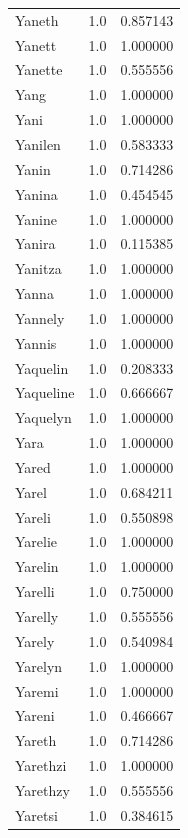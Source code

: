 \documentclass[
  letterpaper,
  DIV=11,
  numbers=noendperiod]{scrreprt}
\begin{document}
\begin{tabular}{lrr}
Yaneth          &   1.0 &   0.857143 \\
Yanett          &   1.0 &   1.000000 \\
Yanette         &   1.0 &   0.555556 \\
Yang            &   1.0 &   1.000000 \\
Yani            &   1.0 &   1.000000 \\
Yanilen         &   1.0 &   0.583333 \\
Yanin           &   1.0 &   0.714286 \\
Yanina          &   1.0 &   0.454545 \\
Yanine          &   1.0 &   1.000000 \\
Yanira          &   1.0 &   0.115385 \\
Yanitza         &   1.0 &   1.000000 \\
Yanna           &   1.0 &   1.000000 \\
Yannely         &   1.0 &   1.000000 \\
Yannis          &   1.0 &   1.000000 \\
Yaquelin        &   1.0 &   0.208333 \\
Yaqueline       &   1.0 &   0.666667 \\
Yaquelyn        &   1.0 &   1.000000 \\
Yara            &   1.0 &   1.000000 \\
Yared           &   1.0 &   1.000000 \\
Yarel           &   1.0 &   0.684211 \\
Yareli          &   1.0 &   0.550898 \\
Yarelie         &   1.0 &   1.000000 \\
Yarelin         &   1.0 &   1.000000 \\
Yarelli         &   1.0 &   0.750000 \\
Yarelly         &   1.0 &   0.555556 \\
Yarely          &   1.0 &   0.540984 \\
Yarelyn         &   1.0 &   1.000000 \\
Yaremi          &   1.0 &   1.000000 \\
Yareni          &   1.0 &   0.466667 \\
Yareth          &   1.0 &   0.714286 \\
Yarethzi        &   1.0 &   1.000000 \\
Yarethzy        &   1.0 &   0.555556 \\
Yaretsi         &   1.0 &   0.384615 \\

\end{tabular}
\end{document}

